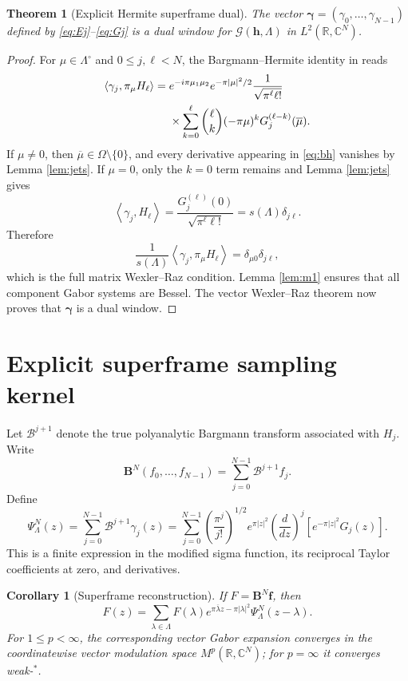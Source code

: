 \documentclass[11pt]{article}
\newtheorem{theorem}{Theorem}
\newtheorem{corollary}{Corollary}
\newcommand{\C}{\mathbb C}
\newcommand{\R}{\mathbb R}
\newcommand{\Barg}{\mathcal B}
\newcommand{\inner}[2]{\left\langle #1,#2\right\rangle}
\begin{document}
\begin{theorem}[Explicit Hermite superframe dual]\label{thm:dual}
The vector $\boldsymbol\gamma=(\gamma_0,\ldots,\gamma_{N-1})$ defined by
\eqref{eq:Ej}--\eqref{eq:Gj} is a dual window for
$\mathcal G(\mathbf h,\Lambda)$ in $L^2(\R,\C^N)$.
\end{theorem}

\begin{proof}
For $\mu\in\Lambda^\circ$ and $0\le j,\ell<N$, the Bargmann--Hermite
identity in \cite{GL} reads
\begin{align}\label{eq:bh}
 \inner{\gamma_j}{\pi_\mu H_\ell}
  ={}&e^{-i\pi\mu_1\mu_2}e^{-\pi|\mu|^2/2}
  \frac1{\sqrt{\pi^\ell\ell!}}\notag\\
  &\times\sum_{k=0}^{\ell}\binom{\ell}{k}(-\pi\mu)^k
       G_j^{(\ell-k)}(\overline\mu).
\end{align}
If $\mu\ne0$, then $\overline\mu\in\Omega\setminus\{0\}$, and every
derivative appearing in \eqref{eq:bh} vanishes by Lemma \ref{lem:jets}.
If $\mu=0$, only the $k=0$ term remains and Lemma \ref{lem:jets} gives
\[
 \inner{\gamma_j}{H_\ell}
 =\frac{G_j^{(\ell)}(0)}{\sqrt{\pi^\ell\ell!}}
 =s(\Lambda)\delta_{j\ell}.
\]
Therefore
\[
 \frac1{s(\Lambda)}
 \inner{\gamma_j}{\pi_\mu H_\ell}
 =\delta_{\mu0}\delta_{j\ell},
\]
which is the full matrix Wexler--Raz condition.  Lemma \ref{lem:m1}
ensures that all component Gabor systems are Bessel.  The vector
Wexler--Raz theorem now proves that $\boldsymbol\gamma$ is a dual window.
\end{proof}

\section{Explicit superframe sampling kernel}

Let $\Barg^{j+1}$ denote the true polyanalytic Bargmann transform associated
with $H_j$.  Write
\[
 \mathbf B^N(f_0,\ldots,f_{N-1})
 =\sum_{j=0}^{N-1}\Barg^{j+1}f_j.
\]
Define
\begin{equation}\label{eq:Psi}
 \Psi_\Lambda^N(z)
 =\sum_{j=0}^{N-1}\Barg^{j+1}\gamma_j(z)
 =\sum_{j=0}^{N-1}
 \left(\frac{\pi^j}{j!}\right)^{1/2}
 e^{\pi|z|^2}\left(\frac d{dz}\right)^j
 \left[e^{-\pi|z|^2}G_j(z)\right].
\end{equation}
This is a finite expression in the modified sigma function, its reciprocal
Taylor coefficients at zero, and derivatives.

\begin{corollary}[Superframe reconstruction]
If $F=\mathbf B^N\mathbf f$, then
\begin{equation}\label{eq:sampling}
 F(z)=\sum_{\lambda\in\Lambda}
 F(\lambda)e^{\pi\overline\lambda z-\pi|\lambda|^2}
 \Psi_\Lambda^N(z-\lambda).
\end{equation}
For $1\le p<\infty$, the corresponding vector Gabor expansion converges in
the coordinatewise vector modulation space $M^p(\R,\C^N)$; for $p=\infty$
it converges weak-$^*$.
\end{corollary}
\end{document}
